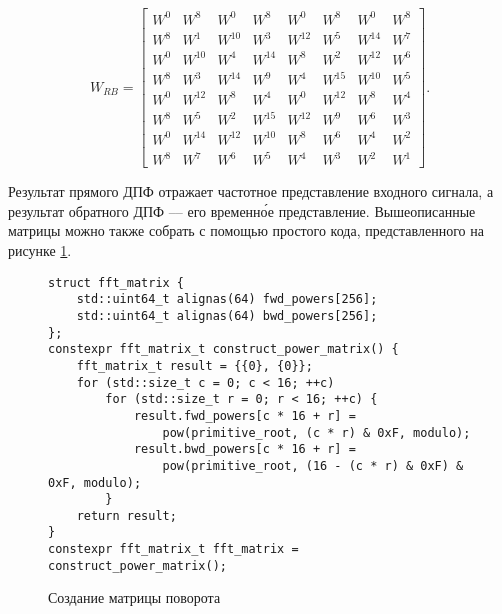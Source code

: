 $$
W_{RB} =
\begin{bmatrix}
W^0 &   W^8  &   W^0  &   W^8  &   W^0  &   W^8  &   W^0  &   W^8  \\
W^8 &   W^1  & W^{10} &   W^3  & W^{12} &   W^5  & W^{14} &   W^7  \\
W^0 & W^{10} &   W^4  & W^{14} &   W^8  &   W^2  & W^{12} &   W^6  \\
W^8 &   W^3  & W^{14} &   W^9  &   W^4  & W^{15} & W^{10} &   W^5  \\
W^0 & W^{12} &   W^8  &   W^4  &   W^0  & W^{12} &   W^8  &   W^4  \\
W^8 &   W^5  &   W^2  & W^{15} & W^{12} &   W^9  &   W^6  &   W^3  \\
W^0 & W^{14} & W^{12} & W^{10} &   W^8  &   W^6  &   W^4  &   W^2  \\
W^8 &   W^7  &   W^6  &   W^5  &   W^4  &   W^3  &   W^2  &   W^1
\end{bmatrix}.
$$

Результат прямого ДПФ отражает частотное представление входного сигнала, а результат обратного ДПФ --– его временн\'{о}е представление.
Вышеописанные матрицы можно также собрать с помощью простого кода, представленного на рисунке \ref{fig: rotation matrix creation}.
\begin{figure}[ht]
\begin{lstlisting}[language={[11]C++}]
struct fft_matrix {
	std::uint64_t alignas(64) fwd_powers[256];
	std::uint64_t alignas(64) bwd_powers[256];
};
constexpr fft_matrix_t construct_power_matrix() {
	fft_matrix_t result = {{0}, {0}};
	for (std::size_t c = 0; c < 16; ++c)
		for (std::size_t r = 0; r < 16; ++c) {
			result.fwd_powers[c * 16 + r] =
				pow(primitive_root, (c * r) & 0xF, modulo);
			result.bwd_powers[c * 16 + r] =
				pow(primitive_root, (16 - (c * r) & 0xF) & 0xF, modulo);
		}
	return result;
}
constexpr fft_matrix_t fft_matrix = construct_power_matrix();
\end{lstlisting}
\caption{Создание матрицы поворота}
\label{fig: rotation matrix creation}
\end{figure}

